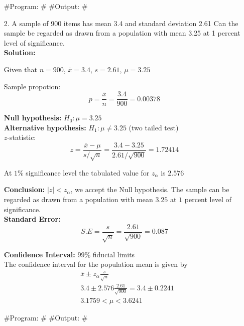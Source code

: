 \documentclass[a4paper,10pt,openright]{report}
\begin{document}
\begin{enumerate}
#Program:
#
#Output:
#


\item[2.] A sample of 900 items has mean 3.4 and standard deviation 2.61 Can the sample be
regarded as drawn from a population with mean 3.25 at 1 percent level of significance. \\

\textbf{Solution:}

Given that $n = 900$, $\bar x = 3.4$, $s = 2.61$, $\mu = 3.25$

Sample propotion: 
\begin{equation*}
p = \frac{\bar x}{n} = \frac{3.4}{900} = 0.00378
\end{equation*}

\textbf{Null hypothesis:} $H_{0}: \mu = 3.25$ \\
\textbf{Alternative hypothesis:} $H_{1}: \mu \neq 3.25$ \hspace{5px} (two tailed test) \\

$z$-statistic:
\begin{equation*}
z = \frac{\bar x -\mu}{s/\sqrt{n}} = \frac{3.4 - 3.25}{2.61/\sqrt{900}} = 1.72414
\end{equation*}

At $1\%$ significance level the tabulated value for $z_{\alpha}$ is $2.576$

\textbf{Conclusion:} $|z| < z_{\alpha}$, we accept the Null hypothesis. The sample can be
regarded as drawn from a population with mean $3.25$ at $1$ percent level of significance.\\

\textbf{Standard Error:}
\begin{equation*}
S.E = \frac{s}{\sqrt{n}} = \frac{2.61}{\sqrt{900}} = 0.087
\end{equation*}

\textbf{Confidence Interval:} $99\%$ fiducial limits \\
The confidence interval for the population mean is given by
\begin{equation*}
\begin{split}
&\bar x \pm z_{\alpha} \frac{s}{\sqrt{n}} \\
&3.4 \pm 2.576 \frac{2.61}{\sqrt{900}} = 3.4 \pm 0.2241 \\
&3.1759 < \mu < 3.6241
\end{split}
\end{equation*}

#Program:
#
#Output:
#

\end{enumerate}
\end{document}
